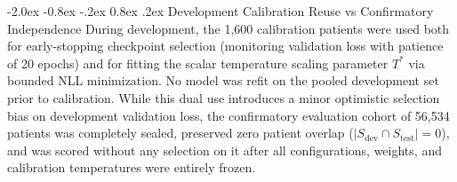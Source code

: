 \documentclass[10pt,a4paper]{article}
\makeatletter
\renewcommand{\subsection}{\@startsection{subsection}{2}{\z@}%
  {-2.0ex \@plus -0.8ex \@minus -.2ex}%
  {0.8ex \@plus.2ex}%
  {\normalfont\large\sffamily\bfseries\color{naturedark}}}
\makeatother
\begin{document}
\subsection{Development Calibration Reuse vs Confirmatory Independence}
During development, the 1,600 calibration patients were used both for early-stopping checkpoint selection (monitoring validation loss with patience of 20 epochs) and for fitting the scalar temperature scaling parameter $T^*$ via bounded NLL minimization. No model was refit on the pooled development set prior to calibration. While this dual use introduces a minor optimistic selection bias on development validation loss, the confirmatory evaluation cohort of 56,534 patients was completely sealed, preserved zero patient overlap ($|S_{\text{dev}} \cap S_{\text{test}}| = 0$), and was scored without any selection on it after all configurations, weights, and calibration temperatures were entirely frozen.
\end{document}
